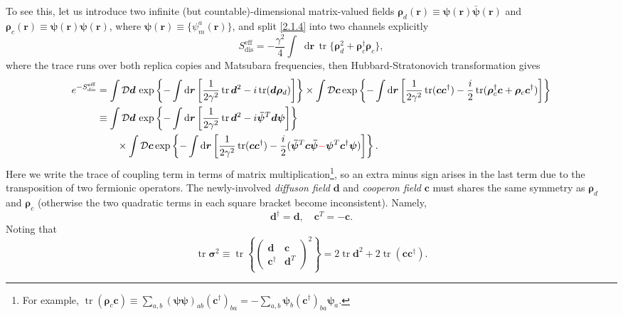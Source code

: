 \documentclass[10pt,nofootinbib,letterpaper]{revtex4}
\newcommand*\dd{\mathop{}\!\mathrm{d}}
\def\D{\mathcal{D}}
\begin{document}
		To see this, let us introduce two infinite (but countable)-dimensional matrix-valued fields $\bm{\rho}_d(\bm{r})\equiv\bm{\psi}(\bm{r})\bm{\bar{\psi}}(\bm{r})$ and $\bm{\rho}_c(\bm{r})\equiv\bm{\psi}(\bm{r})\bm{\psi}(\bm{r})$, where $\bm{\psi}(\bm{r})\equiv\{\psi_m^a(\bm{r})\}$, and split \eqref{2.1.4} into two channels explicitly
		\begin{equation*}
			S_{\text{dis}}^{\text{eff}}=-\dfrac{\gamma^2}{4}\int\dd\bm{r}\,\mathop{\mathrm{tr}}\bigg\{\bm{\rho}_d^2+\bm{\rho}_c^\dagger\bm{\rho}_c\bigg\},
		\end{equation*}
		where the trace runs over both replica copies and Matsubara frequencies, then Hubbard-Stratonovich transformation gives
		\begin{align}\label{2.1.5}
			e^{-S_{\text{dis}}^{\text{eff}}}&=\int\D\bm{d}\,\exp\left\{-\int\dd\bm{r}\left[\dfrac{1}{2\gamma^2}\mathop{\mathrm{tr}}\bm{d}^2-i\mathop{\mathrm{tr}}(\bm{d}\bm{\rho}_d)\right]\right\}\times\int\D\bm{c}\exp\left\{-\int\dd\bm{r}\left[\dfrac{1}{2\gamma^2}\mathop{\mathrm{tr}}(\bm{c}\bm{c}^\dagger)-\dfrac{i}{2}\mathop{\mathrm{tr}}(\bm{\rho}_c^\dagger\bm{c}+\bm{\rho}_c\bm{c}^\dagger)\right]\right\}\nonumber\\
			&\equiv\int\D\bm{d}\,\exp\left\{-\int\dd\bm{r}\left[\dfrac{1}{2\gamma^2}\mathop{\mathrm{tr}}\bm{d}^2-i\bm{\bar\psi}^T\bm{d}\bm{\psi}\right]\right\}\nonumber\\
			&\qquad\times\int\D\bm{c}\exp\left\{-\int\dd\bm{r}\left[\dfrac{1}{2\gamma^2}\mathop{\mathrm{tr}}(\bm{c}\bm{c}^\dagger)-\dfrac{i}{2}(\bm{\bar\psi}^T\bm{c}\bm{\bar\psi}{\color{red}-}\bm{\psi}^T\bm{c}^\dagger\bm{\psi})\right]\right\}.
		\end{align}
		Here we write the trace of coupling term in terms of matrix multiplication\footnote{For example, $\mathop{\mathrm{tr}}(\bm{\rho}_c\bm{c})\equiv\sum_{a,b}(\bm{\psi}\bm{\psi})_{ab}(\bm{c}^\dagger)_{ba}=-\sum_{a,b}\bm{\psi}_b(\bm{c}^\dagger)_{ba}\bm{\psi}_a$.}, so an extra minus sign arises in the last term due to the transposition of two fermionic operators. The newly-involved \emph{diffuson field} $\bm{d}$ and \emph{cooperon field} $\bm{c}$ must shares the same symmetry as $\bm{\rho}_d$ and $\bm{\rho}_c$ (otherwise the two quadratic terms in each square bracket become inconsistent). Namely,
		\begin{equation}\label{2.1.6}
			\bm{d}^\dagger=\bm{d},\quad \bm{c}^T=-\bm{c}.
		\end{equation}
		Noting that
		\begin{equation*}
			\mathop{\mathrm{tr}}\bm{\sigma}^2\equiv\mathop{\mathrm{tr}}\left\{\left(\begin{array}{cc}
				\bm{d} & \bm{c}\\\bm{c}^\dagger & \bm{d}^T
			\end{array}\right)^2\right\}=2\mathop{\mathrm{tr}}\bm{d}^2+2\mathop{\mathrm{tr}}(\bm{c}\bm{c}^\dagger).
		\end{equation*}
\end{document}

